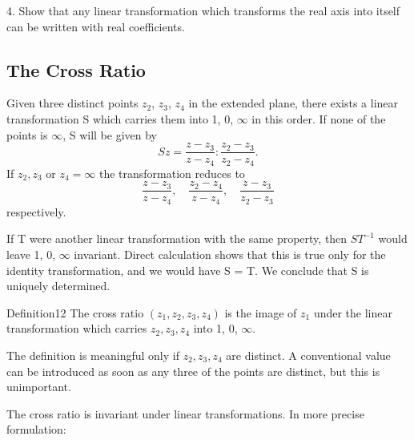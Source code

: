 4. Show that any linear transformation which transforms the real axis into itself can be written with real coefficients.

\setcounter{section}{3}\setcounter{subsection}{1}\subsection{The Cross Ratio}\label{sec:3.3.2}
Given three distinct points $z_{2}$, $z_{3}$, $z_{4}$ in the extended plane, there exists a linear transformation S which carries them into 1, 0, $\infty$ in this order. If none of the points is $\infty$, S will be given by
\begin{equation*}
S z = \frac {z - z _ {3}}{z - z _ {4}}: \frac {z _ {2} - z _ {3}}{z _ {2} - z _ {4}}.\tag{9}\label{eq:3.9}
\end{equation*}
If $z_{2}, z_{3}$ or $z_{4} = \infty$ the transformation reduces to
\begin{equation*}
\frac {z - z _ {3}}{z - z _ {4}}, \quad \frac {z _ {2} - z _ {4}}{z - z _ {4}}, \quad \frac {z - z _ {3}}{z _ {2} - z _ {3}}
\end{equation*}
respectively.

If T were another linear transformation with the same property, then $ST^{-1}$ would leave 1, 0, $\infty$ invariant. Direct calculation shows that this is true only for the identity transformation, and we would have S = T. We conclude that S is uniquely determined.

\begin{originalstatement}{Definition}{12}\label{def:3.12}
The cross ratio $(z_{1}, z_{2}, z_{3}, z_{4})$ is the image of $z_{1}$ under the linear transformation which carries $z_{2}, z_{3}, z_{4}$ into 1, 0, $\infty$.
\end{originalstatement}
The definition is meaningful only if $z_{2}, z_{3}, z_{4}$ are distinct. A conventional value can be introduced as soon as any three of the points are distinct, but this is unimportant.


The cross ratio is invariant under linear transformations. In more precise formulation:

